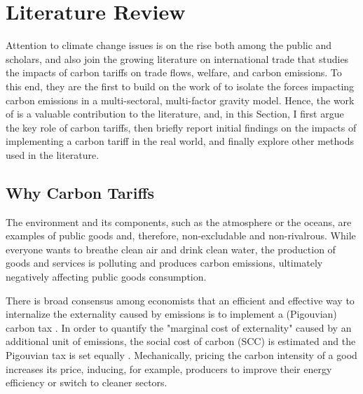 \chapter{Literature Review}
\label{sec:literature}

Attention to climate change issues is on the rise both among the public and scholars, and \textcite{Larch2017} also join the growing literature on international trade that studies the impacts of carbon tariffs on trade flows, welfare, and carbon emissions. To this end, they are the first to build on the work of \textcite{copeland2005} to isolate the forces impacting carbon emissions in a multi-sectoral, multi-factor gravity model. Hence, the work of \textcite{Larch2017} is a valuable contribution to the literature, and, in this Section, I first argue the key role of carbon tariffs, then briefly report initial findings on the impacts of implementing a carbon tariff in the real world, and finally explore other methods used in the literature.


\section{Why Carbon Tariffs}

The environment and its components, such as the atmosphere or the oceans, are examples of public goods and, therefore, non-excludable and non-rivalrous. While everyone wants to breathe clean air and drink clean water, the production of goods and services is polluting and produces carbon emissions, ultimately negatively affecting public goods consumption.

There is broad consensus among economists that an efficient and effective way to internalize the externality caused by emissions is to implement a (Pigouvian) carbon tax \parencite{Geoffrey2019}. In order to quantify the "marginal cost of externality" caused by an additional unit of emissions, the social cost of carbon (SCC) is estimated and the Pigouvian tax is set equally \parencite{Pindyck2017}. Mechanically, pricing the carbon intensity of a good increases its price, inducing, for example, producers to improve their energy efficiency or switch to cleaner sectors.


